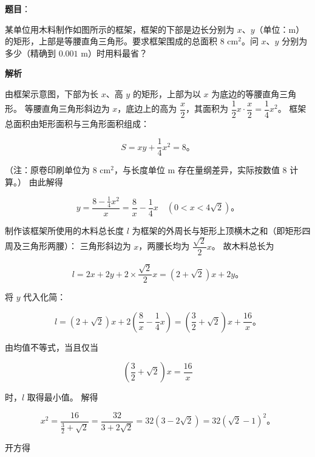 \begin{answer}

\textbf{题目}：

某单位用木料制作如图所示的框架，框架的下部是边长分别为 $x$、$y$（单位：$\mathrm{m}$）的矩形，上部是等腰直角三角形。要求框架围成的总面积 $8\text{ cm}^2$。问 $x$、$y$ 分别为多少（精确到 $0.001\text{ m}$）时用料最省？
\nopagebreak[4]
\begin{center}\end{center}
\nopagebreak[4]
\textbf{解析}

由框架示意图，下部为长 $x$、高 $y$ 的矩形，上部为以 $x$ 为底边的等腰直角三角形。
等腰直角三角形斜边为 $x$，底边上的高为 $\dfrac{x}{2}$，其面积为 $\dfrac{1}{2}x \cdot \dfrac{x}{2} = \dfrac{1}{4}x^2$。
框架总面积由矩形面积与三角形面积组成：

\nopagebreak[4]
\[
S = xy + \dfrac{1}{4}x^2 = 8\mbox{。}
\]

（注：原卷印刷单位为 $8\text{ cm}^2$，与长度单位 $\text{m}$ 存在量纲差异，实际按数值 $8$ 计算。）
由此解得

\nopagebreak[4]
\[
y = \dfrac{8 - \frac{1}{4}x^2}{x} = \dfrac{8}{x} - \dfrac{1}{4}x \quad \left(0 < x < 4\sqrt{2}\right)\mbox{。}
\]

制作该框架所使用的木料总长度 $l$ 为框架的外周长与矩形上顶横木之和（即矩形四周及三角形两腰）：
三角形斜边为 $x$，两腰长均为 $\dfrac{\sqrt{2}}{2}x$。
故木料总长为

\nopagebreak[4]
\[
l = 2x + 2y + 2 \times \dfrac{\sqrt{2}}{2}x = (2 + \sqrt{2})x + 2y\mbox{。}
\]

将 $y$ 代入化简：

\nopagebreak[4]
\[
l = (2 + \sqrt{2})x + 2\left(\dfrac{8}{x} - \dfrac{1}{4}x\right) = \left(\dfrac{3}{2} + \sqrt{2}\right)x + \dfrac{16}{x}\mbox{。}
\]

由均值不等式，当且仅当

\nopagebreak[4]
\[
\left(\dfrac{3}{2} + \sqrt{2}\right)x = \dfrac{16}{x}
\]

时，$l$ 取得最小值。
解得

\nopagebreak[4]
\[
x^2 = \dfrac{16}{\frac{3}{2} + \sqrt{2}} = \dfrac{32}{3 + 2\sqrt{2}} = 32(3 - 2\sqrt{2}) = 32(\sqrt{2} - 1)^2\mbox{。}
\]

开方得


\end{answer}

